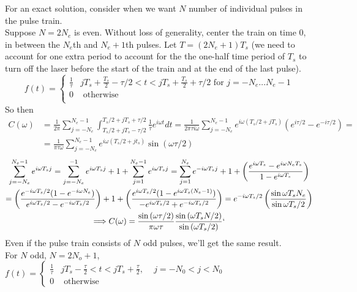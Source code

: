 \documentclass[twoside,10pt]{amsart}
\begin{document}
For an exact solution, consider when we want $N$ number of individual pulses in the pulse train.  \\
Suppose $N= 2N_e$ is even.  Without loss of generality, center the train on time $0$, in between the $N_e$th and $N_e+1$th pulses.  Let $T = (2N_e + 1)T_s$ (we need to account for one extra period to account for the the one-half time period of $T_s$ to turn off the laser before the start of the train and at the end of the last pulse).  
\[
f(t) = \begin{cases} \frac{1}{\tau} & jT_s +\frac{T_s}{2} - \tau/2 < t < jT_s + \frac{T_s}{2} + \tau/2 \text{ for } j = -N_e \dots N_e -1 \\
  0 & \text{ otherwise } \\
\end{cases}
\]
So then 
\[
\begin{aligned}
  C(\omega) & = \frac{1}{2\pi } \sum_{j={-N_e}}^{N_e -1} \int_{T_s/2 + jT_s -\tau/2}^{T_s/2 + jT_s + \tau/2} \frac{1}{\tau} e^{i\omega t} dt = \frac{1}{ 2\pi \tau i \omega} \sum_{j=-N_e}^{N_e-1} e^{ i \omega (T_s/2 + jT_s ) }(e^{i\tau/2} - e^{-i\tau/2} ) = \\
  & = \frac{1}{ \pi \tau \omega} \sum_{j=-N_e}^{N_e-1} e^{i \omega (T_s/2 + jt_s) } \sin{ (\omega \tau/2) } 
\end{aligned}
\]
\[
\begin{gathered}
  \sum_{j=-N_e}^{N_e-1} e^{i \omega T_s j } = \sum_{j=-N_e}^{-1} e^{ i \omega T_s j } + 1 + \sum_{j = 1}^{N_e-1} e^{i \omega T_s j } = \sum_{j=1}^{N_e} e^{ - i \omega T_s j} + 1 + \left( \frac{ e^{ i \omega T_s } - e^{i \omega N_e T_s }}{ 1 - e^{ i \omega T_s } } \right) \\
  = \left( \frac{ e^{ -i \omega T_s/2} ( 1 - e^{ -i \omega N_e } ) }{ e^{i \omega T_s/2} - e^{ -i \omega T_s/2} } \right) + 1 + \left( \frac{ e^{ i \omega T_s/2} ( 1 - e^{ i \omega T_s (N_e - 1) } ) }{ - e^{ i \omega T_s/2} + e^{ -i \omega T_s/2} } \right) = e^{ -i \omega T_s/2}\left( \frac{ \sin{ \omega T_s N_e } }{ \sin{ \omega T_s/ 2 } } \right) \\
\Longrightarrow C(\omega) = \frac{ \sin{ (\omega \tau /2 )}}{ \pi \omega \tau } \frac{ \sin{ (\omega T_s N/2)}}{ \sin{ (\omega T_s/2 )} }`
\end{gathered}
\]
Even if the pulse train consists of $N$ odd pulses, we'll get the same result.  \\
For $N$ odd, $N = 2N_o + 1$, $f(t) = \begin{cases} \frac{1}{\tau} & j T_s - \frac{\tau}{2} < t < j T_s + \frac{ \tau}{2}, \quad \, j = -N_0 < j < N_0 \\
  0 & \text{ otherwise } \end{cases} $ \\
\end{document}
